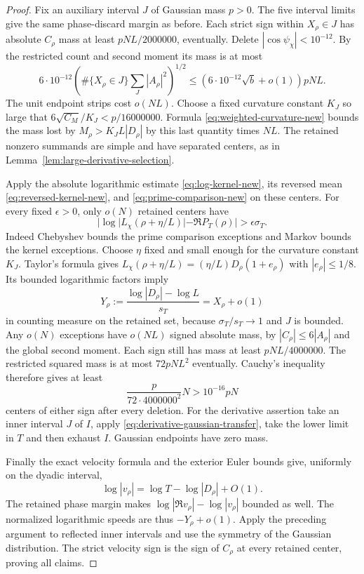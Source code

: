 \begin{proof}
Fix an auxiliary interval $J$ of Gaussian mass $p>0$. The five
interval limits give the same phase-discard margin as before.
Each strict sign within $X_\rho\in J$ has absolute $C_\rho$ mass
at least $pNL/2000000$, eventually.
Delete $|\cos\psi_\chi|<10^{-12}$. By the restricted count and
second moment its mass is at most
\[
 6\cdot10^{-12}
 \left(\#\{X_\rho\in J\}\sum_J|A_\rho|^2\right)^{1/2}
       \le (6\cdot10^{-12}\sqrt b+o(1))pNL.
\]
The unit endpoint strips cost $o(NL)$. Choose a fixed curvature
constant $K_J$ so large that
$6\sqrt{C_M}/K_J<p/16000000$. Formula
\eqref{eq:weighted-curvature-new} bounds the mass lost by
$M_\rho>K_JL|D_\rho|$ by this last quantity times $NL$.
The retained nonzero summands are simple and have separated centers,
as in Lemma~\ref{lem:large-derivative-selection}.

Apply the absolute logarithmic estimate
\eqref{eq:log-kernel-new}, its reversed mean
\eqref{eq:reversed-kernel-new}, and
\eqref{eq:prime-comparison-new} on these centers. For every fixed
$\epsilon>0$, only $o(N)$ retained centers have
\[
 |\log|L_\chi(\rho+\eta/L)|-\Re P_T(\rho)|
                                      >\epsilon\sigma_T.
\]
Indeed Chebyshev bounds the prime comparison exceptions and Markov
bounds the kernel exceptions. Choose $\eta$ fixed and small enough
for the curvature constant $K_J$. Taylor's formula gives
$L_\chi(\rho+\eta/L)=(\eta/L)D_\rho(1+e_\rho)$ with
$|e_\rho|\le1/8$. Its bounded logarithmic factors imply
\begin{equation}\label{eq:derivative-gaussian-transfer}
       Y_\rho:=\frac{\log|D_\rho|-\log L}{s_T}
                   =X_\rho+o(1)
\end{equation}
in counting measure on the retained set, because
$\sigma_T/s_T\to1$ and $J$ is bounded.
Any $o(N)$ exceptions have $o(NL)$ signed absolute mass, by
$|C_\rho|\le6|A_\rho|$ and the global second moment.
Each sign still has mass at least $pNL/4000000$.
The restricted squared mass is at most $72pNL^2$ eventually.
Cauchy's inequality therefore gives at least
\[
              \frac{p}{72\cdot4000000^2}N>10^{-16}pN
\]
centers of either sign after every deletion.
For the derivative assertion take an inner interval $J$ of $I$,
apply \eqref{eq:derivative-gaussian-transfer}, take the lower limit
in $T$ and then exhaust $I$. Gaussian endpoints have zero mass.

Finally the exact velocity formula and the exterior Euler bounds
give, uniformly on the dyadic interval,
\[
             \log|v_\rho|=\log T-\log|D_\rho|+O(1).
\]
The retained phase margin makes
$\log|\Re v_\rho|-\log|v_\rho|$ bounded as well.
The normalized logarithmic speeds are thus $-Y_\rho+o(1)$.
Apply the preceding argument to reflected inner intervals and use
the symmetry of the Gaussian distribution. The strict velocity sign
is the sign of $C_\rho$ at every retained center, proving all claims.
\end{proof}

